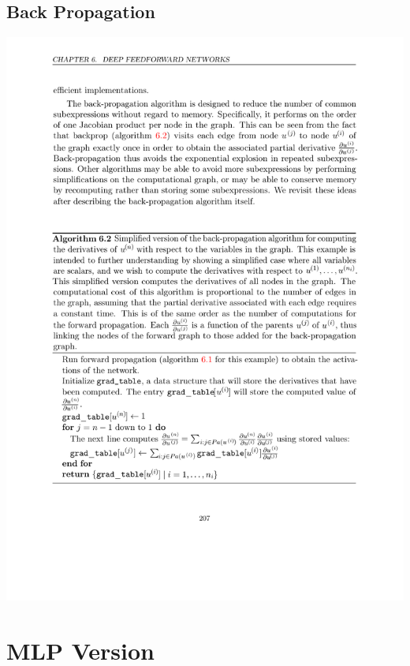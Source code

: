 \documentclass[12pt, a4paper]{article}
\begin{document}
\subsection{Back Propagation}
\includegraphics[width=\textwidth]{../imgs/Back_propagation.pdf}


\section{MLP Version}
\end{document}
